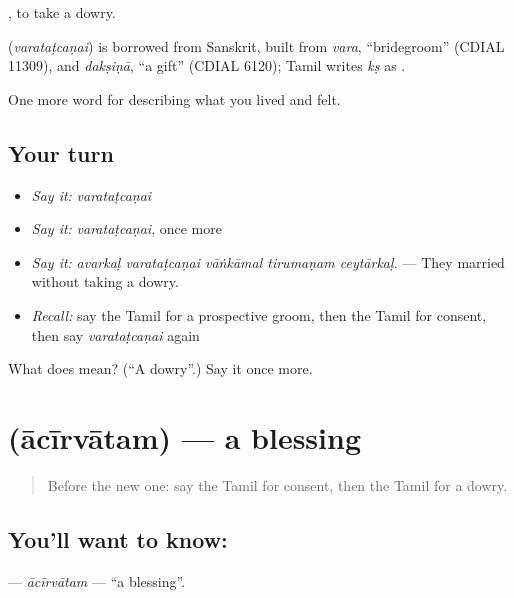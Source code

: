  , to take a dowry.

\begin{cousinweb}
\textbf{} (\emph{varataṭcaṇai}) is borrowed from Sanskrit, built from \emph{vara}, \textquotedblleft{}bridegroom\textquotedblright{} (CDIAL 11309), and \emph{dakṣiṇā}, \textquotedblleft{}a gift\textquotedblright{} (CDIAL 6120); Tamil writes \emph{kṣ} as .
\end{cousinweb}

\begin{grammarlens}[title={What you've built}]
One more word for describing what you lived and felt.
\end{grammarlens}

\subsection*{Your turn}
\begin{itemize}
\raggedright
  \item \emph{Say it:} \emph{varataṭcaṇai}
  \item \emph{Say it:} \emph{varataṭcaṇai}, once more
  \item \emph{Say it:} \emph{avarkaḷ varataṭcaṇai vāṅkāmal tirumaṇam ceytārkaḷ.} — They married without taking a dowry.
  \item \emph{Recall:} say the Tamil for a prospective groom, then the Tamil for consent, then say \emph{varataṭcaṇai} again
\end{itemize}

\begin{tcolorbox}[breakable,colback=teal!4,colframe=teal!35!black,title={Before you move on}]
What does  mean? (\textquotedblleft{}A dowry\textquotedblright{}.) Say it once more.
\end{tcolorbox}
\section[\texorpdfstring{\ta{ஆசீர்வாதம்} (ācīrvātam)}{ஆசீர்வாதம் (ācīrvātam)}]{ (ācīrvātam) — a blessing}

\label{lesson:TA-C499-acirvatam}



\begin{quote}
Before the new one: say the Tamil for consent, then the Tamil for a dowry.
\end{quote}

\subsection*{You'll want to know: }
\textbf{} — \emph{ācīrvātam} — \textquotedblleft{}a blessing\textquotedblright{}.

